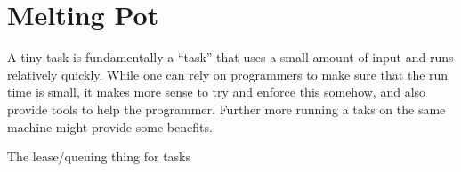 \section{Melting Pot}
\begin{myitemize}
\item A tiny task is fundamentally a ``task'' that uses a small amount of input and runs relatively quickly. While one
can rely on programmers to make sure that the run time is small, it makes more sense to try and enforce this somehow,
and also provide tools to help the programmer. Further more running a taks on the same machine might provide some
benefits.
\item The lease/queuing thing for tasks
\item 
\end{myitemize}
